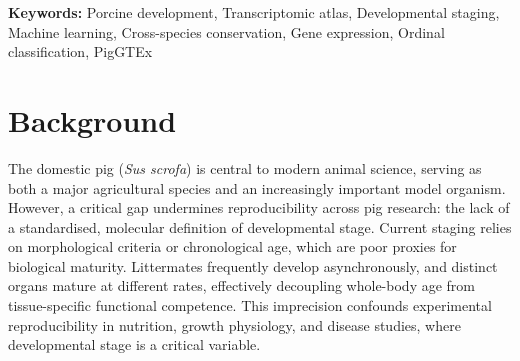 \documentclass[10pt,a4paper]{article}
\begin{document}
\noindent\textbf{Keywords:} Porcine development, Transcriptomic atlas, Developmental staging, Machine learning, Cross-species conservation, Gene expression, Ordinal classification, PigGTEx

\vspace{1cm}

\section{Background}

The domestic pig (\textit{Sus scrofa}) is central to modern animal science, serving as both a major agricultural species and an increasingly important model organism\cite{swindle_swine_2012,lunney_importance_2021,groenen_analyses_2012}. However, a critical gap undermines reproducibility across pig research: the lack of a standardised, molecular definition of developmental stage. Current staging relies on morphological criteria or chronological age, which are poor proxies for biological maturity\cite{boeyer_evidence_2020}. Littermates frequently develop asynchronously, and distinct organs mature at different rates, effectively decoupling whole-body age from tissue-specific functional competence. This imprecision confounds experimental reproducibility in nutrition, growth physiology, and disease studies, where developmental stage is a critical variable\cite{pluske_gastrointestinal_2018}.
\end{document}
